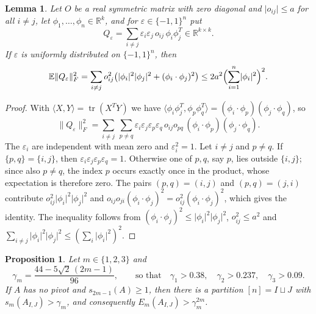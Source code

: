 \documentclass[11pt]{amsart}
\numberwithin{equation}{section}
\newtheorem{lemma}[theorem]{Lemma}
\newtheorem{proposition}[theorem]{Proposition}
\theoremstyle{definition}
\theoremstyle{remark}
\newcommand{\R}{\mathbb R}
\newcommand{\E}{\mathbb E}
\newcommand{\1}{\mathbf 1}
\DeclareMathOperator{\tr}{tr}
\newcommand{\norm}[1]{\lVert #1\rVert}
\newcommand{\abs}[1]{\lvert #1\rvert}
\begin{document}
\begin{lemma}\label{lem:signs}
Let $O$ be a real symmetric matrix with zero diagonal and $\abs{o_{ij}}\le a$ for all $i\ne j$, let $\phi_1,\dots,\phi_n\in\R^k$, and for $\varepsilon\in\{-1,1\}^n$ put
\[
Q_\varepsilon=\sum_{i\ne j}\varepsilon_i\varepsilon_j\,o_{ij}\,\phi_i\phi_j^T\in\R^{k\times k}.
\]
If $\varepsilon$ is uniformly distributed on $\{-1,1\}^n$, then
\[
\E\norm{Q_\varepsilon}_F^2=\sum_{i\ne j}o_{ij}^2\bigl(\abs{\phi_i}^2\abs{\phi_j}^2+(\phi_i\cdot\phi_j)^2\bigr)\le2a^2\Bigl(\sum_{i=1}^n\abs{\phi_i}^2\Bigr)^2 .
\]
\end{lemma}

\begin{proof}
With $\langle X,Y\rangle=\tr(X^TY)$ we have $\langle\phi_i\phi_j^T,\phi_p\phi_q^T\rangle=(\phi_i\cdot\phi_p)(\phi_j\cdot\phi_q)$, so
\[
\norm{Q_\varepsilon}_F^2=\sum_{i\ne j}\ \sum_{p\ne q}\varepsilon_i\varepsilon_j\varepsilon_p\varepsilon_q\,o_{ij}o_{pq}\,(\phi_i\cdot\phi_p)(\phi_j\cdot\phi_q).
\]
The $\varepsilon_i$ are independent with mean zero and $\varepsilon_i^2=1$. Let $i\ne j$ and $p\ne q$. If $\{p,q\}=\{i,j\}$, then $\varepsilon_i\varepsilon_j\varepsilon_p\varepsilon_q=1$. Otherwise one of $p,q$, say $p$, lies outside $\{i,j\}$; since also $p\ne q$, the index $p$ occurs exactly once in the product, whose expectation is therefore zero. The pairs $(p,q)=(i,j)$ and $(p,q)=(j,i)$ contribute $o_{ij}^2\abs{\phi_i}^2\abs{\phi_j}^2$ and $o_{ij}o_{ji}(\phi_i\cdot\phi_j)^2=o_{ij}^2(\phi_i\cdot\phi_j)^2$, which gives the identity. The inequality follows from $(\phi_i\cdot\phi_j)^2\le\abs{\phi_i}^2\abs{\phi_j}^2$, $o_{ij}^2\le a^2$ and $\sum_{i\ne j}\abs{\phi_i}^2\abs{\phi_j}^2\le(\sum_i\abs{\phi_i}^2)^2$.
\end{proof}

\begin{proposition}\label{prop:signs}
Let $m\in\{1,2,3\}$ and
\[
\gamma_m=\frac{44-5\sqrt2\,(2m-1)}{96},\qquad\text{so that}\quad\gamma_1>0.38,\quad\gamma_2>0.237,\quad\gamma_3>0.09 .
\]
If $A$ has no pivot and $s_{2m-1}(A)\ge1$, then there is a partition $[n]=I\sqcup J$ with $s_m(A_{I,J})>\gamma_m$, and consequently $E_m(A_{I,J})>\gamma_m^{2m}$.
\end{proposition}
\end{document}
